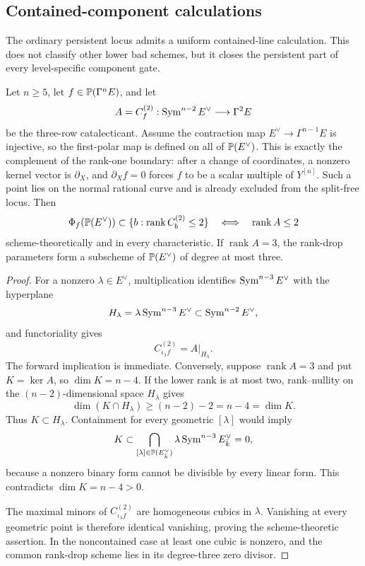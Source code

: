 \subsection{Contained-component calculations}

The ordinary persistent locus admits a uniform contained-line
calculation.  This does not classify other lower bad schemes, but it
closes the persistent part of every level-specific component gate.

\begin{proposition}
\label{prop:contained-rank-two}%
%
Let $n\geq5$, let $f\in\mathbb P(\Gamma^nE)$, and let
\[
 A=C_f^{(2)}:\operatorname{Sym}^{n-2}E^\vee\longrightarrow\Gamma^2E
\]
be the three-row catalecticant.  Assume the contraction map
$E^\vee\to\Gamma^{n-1}E$ is injective, so the first-polar map is
defined on all of $\mathbb P(E^\vee)$.  This is exactly the complement of
the rank-one boundary: after a change of coordinates, a nonzero
kernel vector is $\partial_X$, and
$\partial_Xf=0$ forces $f$ to be a scalar multiple of $Y^{[n]}$.
Such a point lies on the normal rational curve and is already excluded
from the split-free locus.  Then
\[
\Phi_f(\mathbb P(E^\vee))\subset
\{b:\operatorname{rank}C_b^{(2)}\leq2\}
\quad\Longleftrightarrow\quad
\operatorname{rank}A\leq2
\]
scheme-theoretically and in every characteristic.  If
$\operatorname{rank}A=3$, the rank-drop parameters form a subscheme of
$\mathbb P(E^\vee)$ of degree at most three.
\end{proposition}

\begin{proof}
For a nonzero $\lambda\in E^\vee$, multiplication identifies
$\operatorname{Sym}^{n-3}E^\vee$ with the hyperplane
\[
 H_\lambda=\lambda\operatorname{Sym}^{n-3}E^\vee\subset\operatorname{Sym}^{n-2}E^\vee,
\]
and functoriality gives
\[
 C_{\iota_\lambda f}^{(2)}=A|_{H_\lambda}.
\]
The forward implication is immediate.  Conversely, suppose
$\operatorname{rank}A=3$ and put $K=\ker A$, so
$\dim K=n-4$.  If the lower rank is at most two, rank--nullity on the
$(n-2)$-dimensional space $H_\lambda$ gives
\[
 \dim(K\cap H_\lambda)\geq(n-2)-2=n-4=\dim K.
\]
Thus $K\subset H_\lambda$.  Containment for every geometric
$[\lambda]$ would imply
\[
 K\subset\bigcap_{[\lambda]\in\mathbb P(E^\vee_{\bar k})}
 \lambda\operatorname{Sym}^{n-3}E^\vee_{\bar k}=0,
\]
because a nonzero binary form cannot be divisible by every linear
form.  This contradicts $\dim K=n-4>0$.

The maximal minors of $C_{\iota_\lambda f}^{(2)}$ are homogeneous
cubics in $\lambda$.  Vanishing at every geometric point is therefore
identical vanishing, proving the scheme-theoretic assertion.  In the
noncontained case at least one cubic is nonzero, and the common
rank-drop scheme lies in its degree-three zero divisor.
\end{proof}

